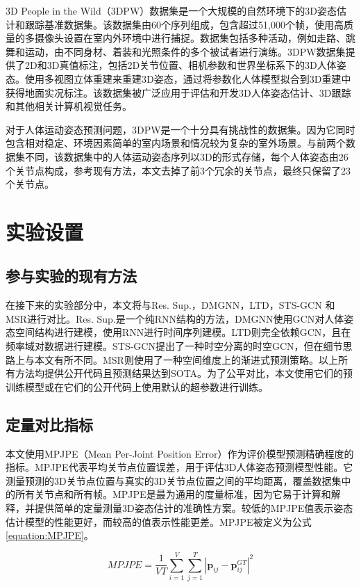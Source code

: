 3D People in the Wild（3DPW）数据集是一个大规模的自然环境下的3D姿态估计和跟踪基准数据集。该数据集由60个序列组成，包含超过51,000个帧，使用高质量的多摄像头设置在室内外环境中进行捕捉。数据集包括多种活动，例如走路、跳舞和运动，由不同身材、着装和光照条件的多个被试者进行演练。3DPW数据集提供了2D和3D真值标注，包括2D关节位置、相机参数和世界坐标系下的3D人体姿态。使用多视图立体重建来重建3D姿态，通过将参数化人体模型拟合到3D重建中获得地面实况标注。该数据集被广泛应用于评估和开发3D人体姿态估计、3D跟踪和其他相关计算机视觉任务。

对于人体运动姿态预测问题，3DPW是一个十分具有挑战性的数据集。因为它同时包含相对稳定、环境因素简单的室内场景和情况较为复杂的室外场景。与前两个数据集不同，该数据集中的人体运动姿态序列以3D的形式存储，每个人体姿态由26个关节点构成，参考现有方法，本文去掉了前3个冗余的关节点，最终只保留了23个关节点。

\section{实验设置}
\subsection{参与实验的现有方法}
在接下来的实验部分中，本文将与Res. Sup.\parencite{martinez2017human}，DMGNN\parencite{li2020dynamic}，LTD\parencite{mao2019learning}，STS-GCN\parencite{sofianos2021space} 和 MSR\parencite{dang2021msr}进行对比。Res. Sup.是一个纯RNN结构的方法，DMGNN使用GCN对人体姿态空间结构进行建模，使用RNN进行时间序列建模。LTD则完全依赖GCN，且在频率域对数据进行建模。STS-GCN提出了一种时空分离的时空GCN，但在细节思路上与本文有所不同。MSR则使用了一种空间维度上的渐进式预测策略。以上所有方法均提供公开代码且预测结果达到SOTA。为了公平对比，本文使用它们的预训练模型或在它们的公开代码上使用默认的超参数进行训练。
\subsection{定量对比指标}
本文使用MPJPE（Mean Per-Joint Position Error）作为评价模型预测精确程度的指标。MPJPE代表平均关节点位置误差，用于评估3D人体姿态预测模型性能。它测量预测的3D关节点位置与真实的3D关节点位置之间的平均距离，覆盖数据集中的所有关节点和所有帧。MPJPE是最为通用的度量标准，因为它易于计算和解释，并提供简单的定量测量3D姿态估计的准确性方案。较低的MPJPE值表示姿态估计模型的性能更好，而较高的值表示性能更差。MPJPE被定义为公式\ref{equation:MPJPE}。

\begin{equation}
    MPJPE = \frac{1}{VT}\sum_{i=1}^{V}\sum_{j=1}^{T} | \mathbf{p}_{ij} - \mathbf{p}^{GT}_{ij} |^2
    \label{equation:MPJPE}
\end{equation}


